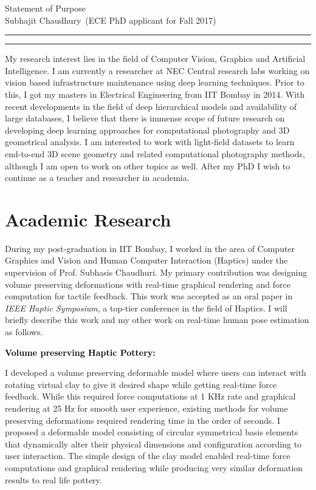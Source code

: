 \documentclass{article}
\newcommand{\soptitle}{Statement of Purpose}
\newcommand{\yourname}{Subhajit Chaudhury}
\newcommand{\statement}[1]{\par\medskip
	{\textcolor{black}{\textbf{#1:}}}\space
}
\begin{document}
	
	\begin{center}\LARGE\soptitle\\
	\large \yourname\ (ECE PhD applicant for Fall 2017)
	\end{center}
	
	\hrule
	\hrule height 1pt
	
	\bigskip
	
	My research interest lies in the field of Computer Vision, Graphics and Artificial Intelligence. I am currently a researcher at NEC Central research labs working on vision based infrastructure maintenance using deep learning techniques. Prior to this, I got my masters in Electrical Engineering from IIT Bombay in 2014. With recent developments in the field of deep hierarchical models and availability of large databases, I believe that there is immense scope of future research on developing deep learning approaches for computational photography and 3D geometrical analysis. I am interested to work with light-field datasets to learn end-to-end 3D scene geometry and related computational photography methods, although I am open to work on other topics as well. After my PhD I wish to continue as a teacher and researcher in academia.
	
	\vspace*{-0.25cm}
	\section{Academic Research}
		\vspace*{-0.25cm}
	During my post-graduation in IIT Bombay, I worked in the area of Computer Graphics and Vision and Human Computer Interaction (Haptics) under the supervision of Prof. Subhasis Chaudhuri. My primary contribution was designing volume preserving deformations with real-time graphical rendering and force computation for tactile feedback. This work was accepted as an oral paper in\textit{ IEEE Haptic Symposium}, a top-tier conference in the field of Haptics. I will briefly describe this work and my other work on real-time human pose estimation as follows.
	
	\statement{Volume preserving Haptic Pottery}
	I developed a volume preserving deformable model where users can interact with rotating virtual clay to give it desired shape while getting real-time force feedback. While this required force computations at 1 KHz rate and graphical rendering at 25 Hz for smooth user experience, existing methods for volume preserving deformations required rendering time in the order of seconds. I proposed a deformable model consisting of circular symmetrical basis elements that dynamically alter their physical dimensions and configuration according to user interaction. The simple design of the clay model enabled real-time force computations and graphical rendering while producing very similar deformation results to real life pottery.
	
\end{document}
